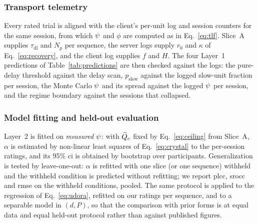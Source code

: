 \subsubsection{Transport telemetry}
Every rated trial is aligned with the client's per-unit log and
session counters for the same session, from which $\psi$ and $\phi$
are computed as in Eq.~\eqref{eq:tlf}. Slice~A supplies
$\tau_{\mathrm{dl}}$ and $N_p$ per sequence, the server logs supply
$r_0$ and $\kappa$ of Eq.~\eqref{eq:recovery}, and the client log
supplies $f$ and $H$. The four Layer~1 predictions of
Table~\ref{tab:predictions} are then checked against the logs: the
pure-delay threshold against the delay scan, $p_{\mathrm{slow}}$
against the logged slow-unit fraction per session, the Monte Carlo
$\psi$ and its spread against the logged $\psi$ per session, and the
regime boundary against the sessions that collapsed.

\subsubsection{Model fitting and held-out evaluation}
Layer~2 is fitted on \emph{measured} $\psi$: with $\widetilde{Q}_c$ fixed by
Eq.~\eqref{eq:ceiling} from Slice~A, $\alpha$ is estimated by
non-linear least squares of Eq.~\eqref{eq:crystal} to the per-session
ratings, and its 95\% \gls{ci} is obtained by bootstrap over
participants. Generalization is tested by leave-one-out: $\alpha$ is
refitted with one slice (or one sequence) withheld and the withheld
condition is predicted without refitting; we report \gls{plcc},
\gls{srocc} and \gls{rmse} on the withheld conditions, pooled. The
same protocol is applied to the regression of Eq.~\eqref{eq:udora},
refitted on our ratings per sequence, and to a separable model in
$(d, P)$, so that the comparison with prior forms is at equal data and
equal held-out protocol rather than against published figures.
